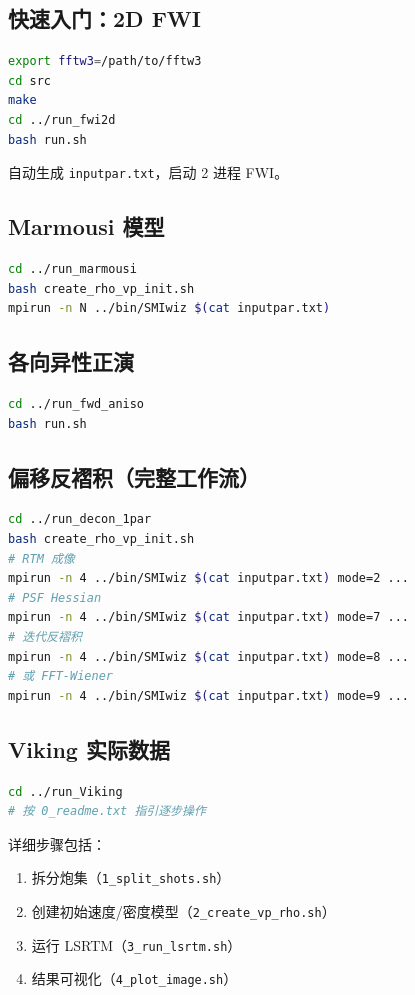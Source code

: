 \documentclass[11pt,a4paper]{ctexart}
\begin{document}
\subsection{快速入门：2D FWI}

\begin{lstlisting}[language=bash]
export fftw3=/path/to/fftw3
cd src
make
cd ../run_fwi2d
bash run.sh
\end{lstlisting}

自动生成 \texttt{inputpar.txt}，启动 2 进程 FWI。

\subsection{Marmousi 模型}

\begin{lstlisting}[language=bash]
cd ../run_marmousi
bash create_rho_vp_init.sh
mpirun -n N ../bin/SMIwiz $(cat inputpar.txt)
\end{lstlisting}

\subsection{各向异性正演}

\begin{lstlisting}[language=bash]
cd ../run_fwd_aniso
bash run.sh
\end{lstlisting}

\subsection{偏移反褶积（完整工作流）}

\begin{lstlisting}[language=bash]
cd ../run_decon_1par
bash create_rho_vp_init.sh
# RTM 成像
mpirun -n 4 ../bin/SMIwiz $(cat inputpar.txt) mode=2 ...
# PSF Hessian
mpirun -n 4 ../bin/SMIwiz $(cat inputpar.txt) mode=7 ...
# 迭代反褶积
mpirun -n 4 ../bin/SMIwiz $(cat inputpar.txt) mode=8 ...
# 或 FFT-Wiener
mpirun -n 4 ../bin/SMIwiz $(cat inputpar.txt) mode=9 ...
\end{lstlisting}

\subsection{Viking 实际数据}

\begin{lstlisting}[language=bash]
cd ../run_Viking
# 按 0_readme.txt 指引逐步操作
\end{lstlisting}

详细步骤包括：
\begin{enumerate}
  \item 拆分炮集（\texttt{1\_split\_shots.sh}）
  \item 创建初始速度/密度模型（\texttt{2\_create\_vp\_rho.sh}）
  \item 运行 LSRTM（\texttt{3\_run\_lsrtm.sh}）
  \item 结果可视化（\texttt{4\_plot\_image.sh}）
\end{enumerate}
\end{document}
